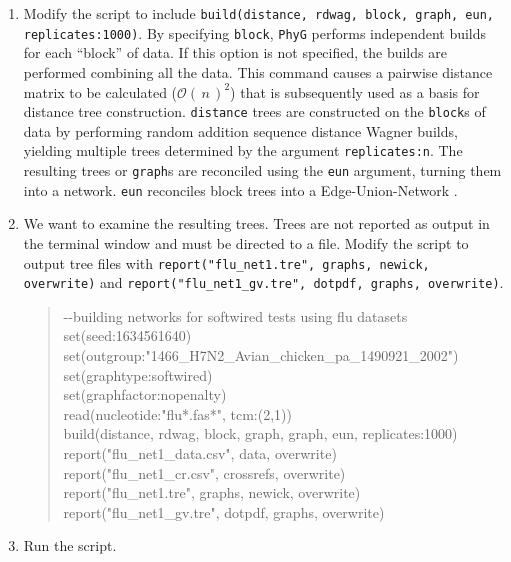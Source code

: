 \documentclass[11pt]{article}
\newcommand{\phyg}{\texttt{PhyG} }
\newcommand{\BigO}[1]{\ensuremath{\mathcal{O}\left(\,#1\,\right)}\xspace}
\begin{document}
\begin{enumerate}

\item Modify the script to include \texttt{build(distance, rdwag, block, graph, eun, 
replicates:1000)}. By specifying \texttt{block}, \phyg performs independent builds 
for each ``block'' of data. If this option is not specified, the builds are performed 
combining all the data. This command causes a pairwise distance matrix to be 
calculated ($\BigO n^2$) that is subsequently used as a basis for distance tree 
construction. \texttt{distance} trees are constructed on the \texttt{block}s of data 
by performing random addition sequence distance Wagner builds, yielding multiple 
trees determined by the argument \texttt{replicates:n}. The resulting trees or 
\texttt{graph}s are reconciled using the \texttt{eun} argument, turning them into 
a network. \texttt{eun} reconciles block trees into a Edge-Union-Network 
\citep{MiyagiandWheeler2019, Wheeler2022}.

\item We want to examine the resulting trees. Trees are not reported as 
output in the terminal window and must be directed to a file. Modify the script 
to output tree files with \texttt{report("flu\_net1.tre", graphs, newick, overwrite)}
and \texttt{report("flu\_net1\_gv.tre", dotpdf, graphs, overwrite)}.

	\begin{quote}	
	-\/-building networks for softwired tests using flu datasets\\
	set(seed:1634561640)\\
	set(outgroup:"1466\_H7N2\_Avian\_chicken\_pa\_1490921\_2002")\\
	set(graphtype:softwired)\\
	set(graphfactor:nopenalty)\\ 
	read(nucleotide:"flu*.fas*", tcm:(2,1))\\
	build(distance, rdwag, block, graph, graph, eun, replicates:1000)\\
	report("flu\_net1\_data.csv", data, overwrite)\\
	report("flu\_net1\_cr.csv", crossrefs, overwrite)\\
	report("flu\_net1.tre", graphs, newick, overwrite)\\
	report("flu\_net1\_gv.tre", dotpdf, graphs, overwrite)
	\end{quote}
	
\item Run the script.


\end{enumerate}
\end{document}
